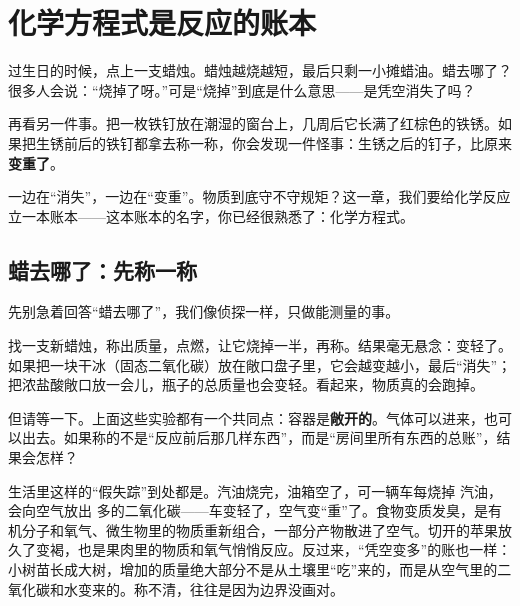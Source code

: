 \chapter{化学方程式是反应的账本}

\begin{kaichang}
过生日的时候，点上一支蜡烛。蜡烛越烧越短，最后只剩一小摊蜡油。蜡去哪了？很多人会说：“烧掉了呀。”可是“烧掉”到底是什么意思——是凭空消失了吗？

再看另一件事。把一枚铁钉放在潮湿的窗台上，几周后它长满了红棕色的铁锈。如果把生锈前后的铁钉都拿去称一称，你会发现一件怪事：生锈之后的钉子，比原来\textbf{变重了}。

一边在“消失”，一边在“变重”。物质到底守不守规矩？这一章，我们要给化学反应立一本账本——这本账本的名字，你已经很熟悉了：化学方程式。
\end{kaichang}

\section{蜡去哪了：先称一称}

先别急着回答“蜡去哪了”，我们像侦探一样，只做能测量的事。

找一支新蜡烛，称出质量，点燃，让它烧掉一半，再称。结果毫无悬念：变轻了。如果把一块干冰（固态二氧化碳）放在敞口盘子里，它会越变越小，最后“消失”；把浓盐酸敞口放一会儿，瓶子的总质量也会变轻。看起来，物质真的会跑掉。

但请等一下。上面这些实验都有一个共同点：容器是\textbf{敞开的}。气体可以进来，也可以出去。如果称的不是“反应前后那几样东西”，而是“房间里所有东西的总账”，结果会怎样？

生活里这样的“假失踪”到处都是。汽油烧完，油箱空了，可一辆车每烧掉  汽油，会向空气放出  多的二氧化碳——车变轻了，空气变“重”了。食物变质发臭，是有机分子和氧气、微生物里的物质重新组合，一部分产物散进了空气。切开的苹果放久了变褐，也是果肉里的物质和氧气悄悄反应。反过来，“凭空变多”的账也一样：小树苗长成大树，增加的质量绝大部分不是从土壤里“吃”来的，而是从空气里的二氧化碳和水变来的。称不清，往往是因为边界没画对。

